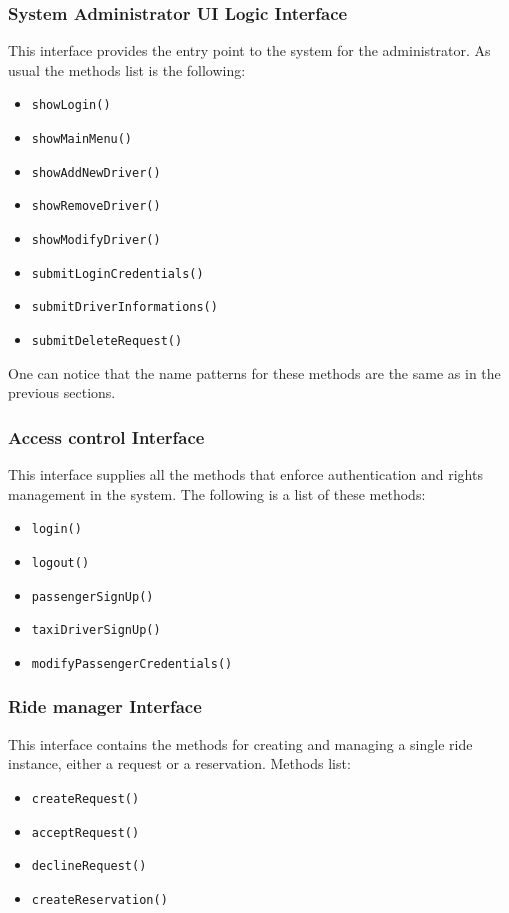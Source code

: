 \subsubsection{System Administrator UI Logic Interface}
This interface provides the entry point to the system for the administrator. \newline
As usual the methods list is the following:
\begin{itemize}
	\item \texttt{showLogin()}
	\item \texttt{showMainMenu()}
	\item \texttt{showAddNewDriver()}
	\item \texttt{showRemoveDriver()}
	\item \texttt{showModifyDriver()}
	\item \texttt{submitLoginCredentials()}
	\item \texttt{submitDriverInformations()}
	\item \texttt{submitDeleteRequest()}
\end{itemize}
One can notice that the name patterns for these methods are the same as in the previous sections.
\subsubsection{Access control Interface}
This interface supplies all the methods that enforce authentication and rights management in the system. \newline
The following is a list of these methods:
\begin{itemize}
	\item \texttt{login()}
	\item \texttt{logout()}
	\item \texttt{passengerSignUp()}
	\item \texttt{taxiDriverSignUp()}
	\item \texttt{modifyPassengerCredentials()}
\end{itemize}
\subsubsection{Ride manager Interface}
This interface contains the methods for creating and managing a single ride instance, either a request or a reservation. \newline
Methods list:
\begin{itemize}
	\item \texttt{createRequest()}
	\item \texttt{acceptRequest()}
	\item \texttt{declineRequest()}
	\item \texttt{createReservation()}
\end{itemize}
